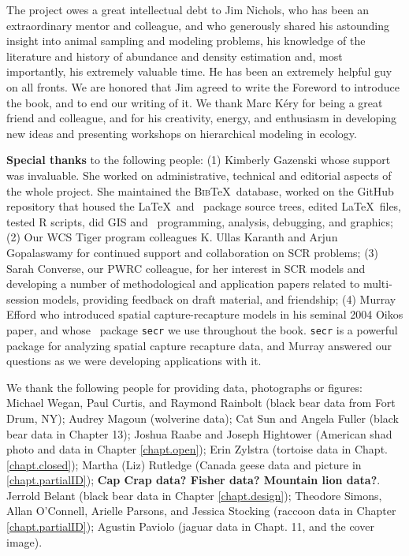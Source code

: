 
The project owes a great intellectual debt to Jim Nichols, who has
been an extraordinary mentor and colleague,
and who %
generously shared his
astounding insight into animal sampling and modeling problems, his
knowledge
of the literature and history of abundance and density estimation
and, most importantly, his extremely valuable time.
He has
been
an %
extremely helpful guy on all fronts. We are honored that Jim
agreed to write the Foreword to introduce the book, and to end our
writing of it.
 We thank Marc K\'{e}ry
for being a great friend and colleague, and for his creativity, %
energy, and enthusiasm in developing new ideas and
presenting workshops on hierarchical modeling in ecology.

{\bf Special thanks} to the following people: (1) Kimberly Gazenski whose support was
invaluable. She worked on administrative, technical and editorial
aspects of the whole project. She maintained the \textsc{Bib}\TeX~database,
worked on the GitHub repository that housed the \LaTeX~and \R~package
source trees, edited \LaTeX~files, tested R scripts, did GIS and
\R~programming, analysis, debugging, and graphics;  (2) Our WCS Tiger
program colleagues K. Ullas Karanth and Arjun Gopalaswamy for
continued support and collaboration on SCR problems;  (3) Sarah
Converse, our PWRC colleague, for her interest in SCR models and
developing a number of methodological and application papers related
to multi-session models, providing feedback on draft material, and
friendship;  (4) Murray Efford who introduced spatial
capture-recapture models %
in his seminal 2004 Oikos paper, and whose \R~package \mbox{\tt secr} we use
throughout the book.  \mbox{\tt secr} is a powerful package for analyzing
spatial capture recapture data, and Murray answered our questions as we
were developing applications with it.

We thank the following people for providing data, photographs or figures:
Michael Wegan, Paul Curtis, and Raymond Rainbolt (black bear data from Fort Drum, NY);
Audrey Magoun (wolverine data); Cat Sun and Angela Fuller (black bear
data in Chapter 13); Joshua Raabe and Joseph Hightower (American shad
photo and data in Chapter \ref{chapt.open}); Erin Zylstra (tortoise
data in Chapt. \ref{chapt.closed}); Martha (Liz) Rutledge (Canada geese
data and picture in \ref{chapt.partialID});  {\bf Cap Crap data?
  Fisher data?  Mountain lion data?}.
Jerrold Belant (black bear data
in Chapter \ref{chapt.design}); Theodore Simons, Allan O'Connell,
Arielle Parsons, and Jessica Stocking (raccoon data in Chapter
\ref{chapt.partialID}); Agustin Paviolo (jaguar data in Chapt. 11, and
the cover image).

